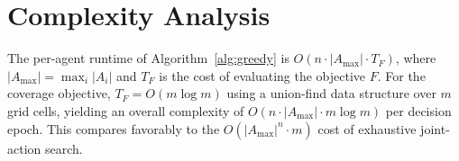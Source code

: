\section{Complexity Analysis}

The per-agent runtime of Algorithm~\ref{alg:greedy} is $O(n \cdot |A_{\max}| \cdot T_F)$,
where $|A_{\max}| = \max_i |A_i|$ and $T_F$ is the cost of evaluating the
objective $F$. For the coverage objective, $T_F = O(m \log m)$ using a
union-find data structure over $m$ grid cells, yielding an overall complexity
of $O(n \cdot |A_{\max}| \cdot m \log m)$ per decision epoch. This compares
favorably to the $O(|A_{\max}|^n \cdot m)$ cost of exhaustive joint-action search.

